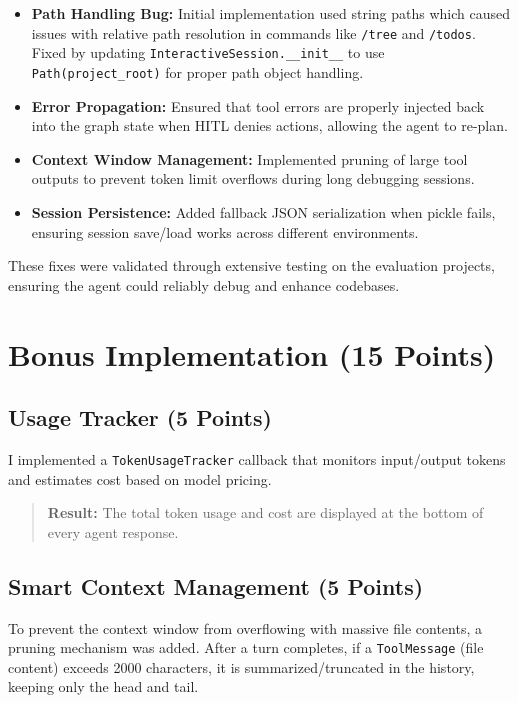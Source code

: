 \documentclass[12pt, a4paper]{article}
\begin{document}
\begin{itemize}
    \item \textbf{Path Handling Bug:} Initial implementation used string paths which caused issues with relative path resolution in commands like \verb|/tree| and \verb|/todos|. Fixed by updating \texttt{InteractiveSession.\_\_init\_\_} to use \verb|Path(project_root)| for proper path object handling.
    \item \textbf{Error Propagation:} Ensured that tool errors are properly injected back into the graph state when HITL denies actions, allowing the agent to re-plan.
    \item \textbf{Context Window Management:} Implemented pruning of large tool outputs to prevent token limit overflows during long debugging sessions.
    \item \textbf{Session Persistence:} Added fallback JSON serialization when pickle fails, ensuring session save/load works across different environments.
\end{itemize}

These fixes were validated through extensive testing on the evaluation projects, ensuring the agent could reliably debug and enhance codebases.

\section{Bonus Implementation (15 Points)}

\subsection{Usage Tracker (5 Points)}
I implemented a \texttt{TokenUsageTracker} callback that monitors input/output tokens and estimates cost based on model pricing.
\begin{quote}
    \textbf{Result:} The total token usage and cost are displayed at the bottom of every agent response.
\end{quote}

\subsection{Smart Context Management (5 Points)}
To prevent the context window from overflowing with massive file contents, a pruning mechanism was added. After a turn completes, if a \texttt{ToolMessage} (file content) exceeds 2000 characters, it is summarized/truncated in the history, keeping only the head and tail.
\end{document}

